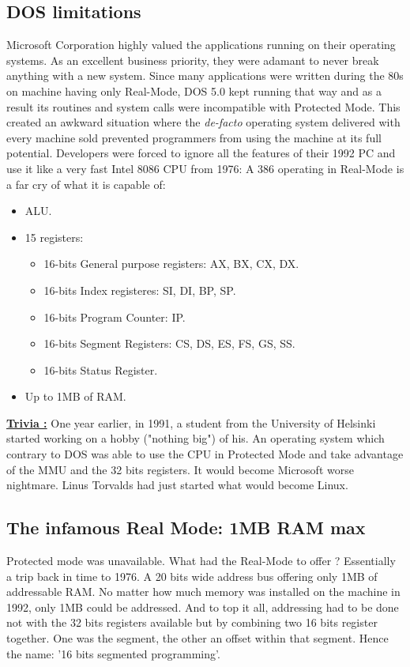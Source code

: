 \documentclass[book.tex]{subfiles}
\begin{document}
  \subsection{DOS limitations}
  Microsoft Corporation highly valued the applications running on their operating systems. As an excellent business priority, they were adamant to never break anything with a new system.  Since many applications were written during the 80s on machine having only Real-Mode, DOS 5.0 kept running that way and as a result its routines and system calls were incompatible with Protected Mode. This created an awkward situation where the \emph{de-facto} operating system delivered with every machine sold prevented programmers from using the machine at its full potential. Developers were forced to ignore all the features of their 1992 PC and use it like a very fast Intel 8086 CPU from 1976: A 386 operating in Real-Mode is a far cry of what it is capable of:\\
\begin{itemize}
\item ALU.
\item 15 registers:
\begin{itemize}
  \item 16-bits General purpose registers: AX, BX, CX, DX.
  \item 16-bits Index registeres: SI, DI, BP, SP.
  \item 16-bits Program Counter: IP.
  \item 16-bits Segment Registers: CS, DS, ES, FS, GS, SS.
  \item 16-bits Status Register.
\end{itemize}
\item Up to 1MB of RAM.
\end{itemize}


\bigskip

 \textbf{\underline{Trivia :}} One year earlier, in 1991, a student from the University of Helsinki started working on a hobby ("nothing big") of his. An operating system which contrary to DOS was able to use the CPU in Protected Mode and take advantage of the MMU and the 32 bits registers. It would become Microsoft worse nightmare. Linus Torvalds had just started what would become Linux.



  \subsection{The infamous Real Mode: 1MB RAM max}
  Protected mode was unavailable. What had the Real-Mode to offer ? Essentially a trip back in time to 1976. A 20 bits wide address bus offering only 1MB of addressable RAM. No matter how much memory was installed on the machine in 1992, only 1MB could be addressed. And to top it all, addressing had to be done not with the 32 bits registers available but by combining two 16 bits register together. One was the segment, the other an offset within that segment. Hence the name: '16 bits segmented programming'.
\end{document}
